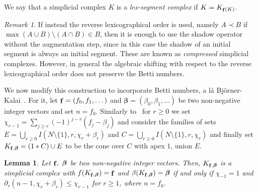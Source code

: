 \documentclass[11pt]{article}
\newtheorem{lemma}[theorem]{Lemma}
\numberwithin{claimcounter}{theorem}
\theoremstyle{remark}
\newtheorem{remark}[theorem]{Remark}
\theoremstyle{definition}
\numberwithin{theorem}{section}
\DeclareMathOperator{\fvec}{\bf f}
\newcommand{\bbeta}{\boldsymbol{\beta}}
\begin{document}
%
We say that a simplicial complex $K$ is a \emph{lex-segment complex} if $K = K_{\fvec(K)}$.
%
\begin{remark}
    If instead the reverse lexicographical order is used, namely $A\prec B$ if $\max (A\cup B)\setminus (A\cap B)\in B$, 
    then it 
    is enough to use the shadow operator without the augmentation step, since in this case the shadow of an initial segment is always an initial segment. 
    These are known as \emph{compressed} simplicial complexes.
    However, in general the algebraic shifting with respect to the reverse lexicographical order does not preserve the Betti numbers.
\end{remark}
%
We now modify this construction to incorporate Betti numbers, a l\'a  Bj\"{o}rner-Kalai~\cite{Bjorner-Kalai-ACTA}.
For it, let $\fvec=(f_0,f_1,\dots)$ and $\bbeta=(\beta_0,\beta_1,\dots)$ be two non-negative integer vectors and set $n=f_0$.
Similarly to~\cite{Bjorner-Kalai-ACTA} for $r\geq 0$ we set $\chi_{r-1}=\sum_{j\geq r}(-1)^{j-r}(f_j-\beta_j)$
and consider the families of sets $E = \bigcup_{r\geq 0} I(N\setminus \{1\},r,\chi_r+\beta_r)$ and
$C=\bigcup_{r\geq 0}I(N\setminus \{1\},r,\chi_r)$ and finally set $K_{\fvec,\bbeta} = (1*C)\cup E$
to be the cone over $C$ with apex $1$, union $E$. 
%
\begin{lemma}
\label{l:homlexsegment}
Let $\fvec,~\bbeta$ be two non-negative integer vectors.
Then, $K_{\fvec, \bbeta}$ is a simplicial complex with $f(K_{\fvec,\bbeta}) = \fvec$ and $\beta (K_{\fvec,\bbeta}) = \bbeta$
if and only if $\chi_{-1}=1$ and $\partial_r (n-1,\chi_r + \beta_r) \leq \chi_{r-1}$ for $r\geq 1$, where $n=f_0$. 
\end{lemma}
\end{document}
